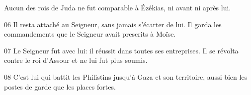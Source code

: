 Aucun des rois de Juda ne fut comparable à Ézékias, ni avant ni après lui.


06 Il resta attaché au Seigneur, sans jamais s’écarter de lui. Il garda les commandements que le Seigneur avait prescrits à Moïse.

07 Le Seigneur fut avec lui: il réussit dans toutes ses entreprises. Il se révolta contre le roi d’Assour et ne lui fut plus soumis.

08 C’est lui qui battit les Philistins jusqu’à Gaza et son territoire, aussi bien les postes de garde que les places fortes.
